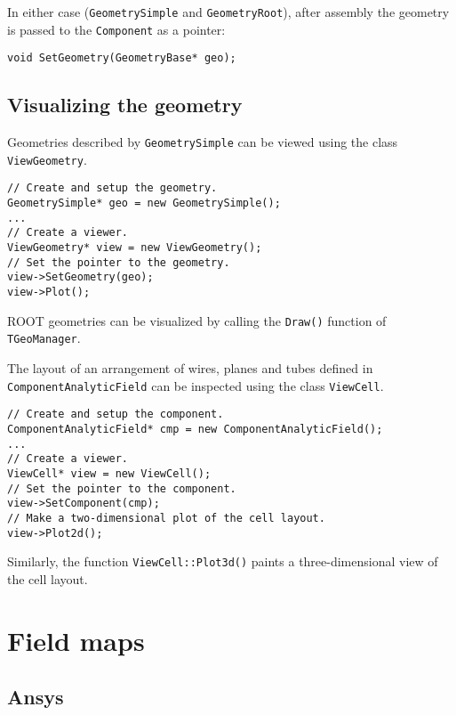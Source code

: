 In either case (\texttt{GeometrySimple} and \texttt{GeometryRoot}),
after assembly the geometry is passed to the \texttt{Component} as a pointer:
\begin{lstlisting}
void SetGeometry(GeometryBase* geo);
\end{lstlisting}

\subsection{Visualizing the geometry}

Geometries described by \texttt{GeometrySimple} can be viewed 
using the class \texttt{ViewGeometry}. 
\begin{lstlisting}
// Create and setup the geometry.
GeometrySimple* geo = new GeometrySimple();
...
// Create a viewer.
ViewGeometry* view = new ViewGeometry();
// Set the pointer to the geometry.
view->SetGeometry(geo);
view->Plot();
\end{lstlisting}

ROOT geometries can be visualized by calling the \texttt{Draw()} function of
\texttt{TGeoManager}. 

The layout of an arrangement of wires, planes and tubes
defined in \texttt{ComponentAnalyticField} 
can be inspected using the class \texttt{ViewCell}.
\begin{lstlisting}
// Create and setup the component.
ComponentAnalyticField* cmp = new ComponentAnalyticField();
... 
// Create a viewer.
ViewCell* view = new ViewCell();
// Set the pointer to the component.
view->SetComponent(cmp);
// Make a two-dimensional plot of the cell layout.
view->Plot2d();
\end{lstlisting}
Similarly, the function \texttt{ViewCell::Plot3d()} paints
a three-dimensional view of the cell layout.

\section{Field maps}

\subsection{Ansys}


